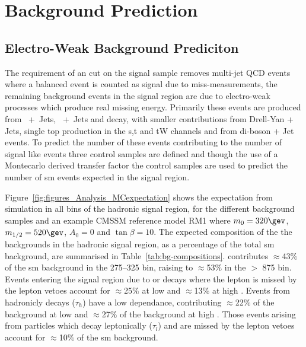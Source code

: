 \chapter{Background Prediction} %

\section{Electro-Weak Background Prediciton} %
\label{sec:electro_weak_background_prediciton}

The requirement of an \alt cut on the signal sample removes multi-jet QCD 
events where a balanced event is counted as signal due to miss-measurements, 
the remaining background events in the signal region are due to electro-weak 
processes which produce real missing energy. Primarily these events are 
produced from \HepProcess{\PZ\to\Pnu\APnu}~+~Jets, 
\HepProcess{\PW\to\Pl\APnu}~+~Jets and \HepProcess{\Ptop\APtop} decay, with 
smaller contributions from Drell-Yan + Jets, single top production in the s,t 
and tW channels and from di-boson + Jet events. To predict the number of these 
events contributing to the number of signal like events three control samples 
are defined and though the use of a Montecarlo derived transfer factor the 
control samples are used to predict the number of \ac{sm} events expected in 
the signal region.


Figure~\ref{fig:figures_Analysis_MCexpectation}\cite{CMS-AN-11-517} shows the 
expectation from simulation in all bins of the hadronic signal region, for the 
different background samples and an example CMSSM reference model RM1 where $m_0=320\gev$, $m_{1/2}=520\gev$, $A_0=0$ and $\tan\beta=10$. 
The expected composition of the the backgrounds in the hadronic signal region, 
as a percentage of the total \ac{sm} background, are summarised in 
Table~\ref{tab:bg-compositions}. \HepProcess{\PZ\to\nu\nu} contributes 
$\approx$43$\%$ of the \ac{sm} background in the 
\unit{275}{\GeV}--\unit{325}{\GeV} \HT bin, raising to $\approx$53$\%$ in the 
\HT $>$ \unit{875}{\GeV} bin. Events entering the signal region due to \PZ or 
\PW decays where the lepton is missed by the lepton vetoes account for 
$\approx$25$\%$ at low \HT and $\approx$13$\%$ at high \HT. Events from 
hadronicly decays \Ptau ($\tau_{h}$) have a low \HT dependance, contributing 
$\approx$22$\%$ of the background at low \HT and $\approx$27$\%$ of the 
background at high \HT. Those events arising from \Ptau particles which decay leptonically ($\tau_{l}$) and are missed by the lepton vetoes account for $\approx$10$\%$ of the \ac{sm} background.

